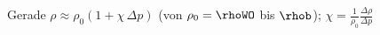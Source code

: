 Gerade $\rho \approx \rho_0\left(1+\chi\,\Delta p\right)$ (von $\rho_0 = \rhoWO$ bis $\rhob$); $\chi = \frac{1}{\rho_0}\frac{\Delta\rho}{\Delta p}$
